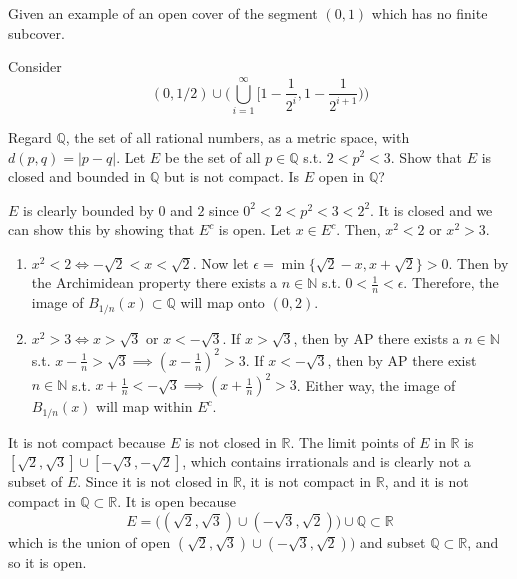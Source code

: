 \documentclass{article}
\begin{document}
    \begin{exercise}[Rudin 2.14]
    Given an example of an open cover of the segment $(0, 1)$ which has no finite subcover. 
    \end{exercise}
    \begin{solution}
    Consider 
    \[(0, 1/2) \cup \bigg( \bigcup_{i=1}^\infty \Big[ 1 - \frac{1}{2^i}, 1 - 
    \frac{1}{2^{i+1}} \Big) \bigg) \]
    \end{solution}

    \begin{exercise}[Rudin 2.15]

    \end{exercise}

    \begin{exercise}[Rudin 2.16]
    Regard $\mathbb{Q}$, the set of all rational numbers, as a metric space, with $d(p, q) = |p - q|$. Let $E$ be the set of all $p \in \mathbb{Q}$ s.t. $2 < p^2 < 3$. Show that $E$ is closed and bounded in $\mathbb{Q}$ but is not compact. Is $E$ open in $\mathbb{Q}$? 
    \end{exercise}
    \begin{solution}
    $E$ is clearly bounded by $0$ and $2$ since $0^2 < 2 < p^2 < 3 < 2^2$. It is closed and we can show this by showing that $E^c$ is open. Let $x \in E^c$. Then, $x^2< 2$ or $x^2 > 3$. 
    \begin{enumerate}
        \item $x^2 < 2 \iff -\sqrt{2} < x < \sqrt{2}$. Now let $\epsilon = \min\{ \sqrt{2} - x, x + \sqrt{2}\} > 0$. Then by the Archimidean property there exists a $n \in \mathbb{N}$ s.t. $0 < \frac{1}{n} < \epsilon$. Therefore, the image of $B_{1/n} (x) \subset \mathbb{Q}$ will map onto $(0, 2)$. 

        \item $x^2 > 3 \iff x > \sqrt{3}$ or $x < - \sqrt{3}$. If $x > \sqrt{3}$, then by AP there exists a $n \in \mathbb{N}$ s.t. $x - \frac{1}{n} > \sqrt{3} \implies (x - \frac{1}{n})^2 > 3$. If $x < - \sqrt{3}$, then by AP there exist $n \in \mathbb{N}$ s.t. $x + \frac{1}{n} < -\sqrt{3} \implies (x + \frac{1}{n})^2 > 3$. Either way, the image of $B_{1/n} (x)$ will map within $E^c$. 
    \end{enumerate}
    It is not compact because $E$ is not closed in $\mathbb{R}$. The limit points of $E$ in $\mathbb{R}$ is $[\sqrt{2}, \sqrt{3}] \cup [-\sqrt{3}, -\sqrt{2}]$, which contains irrationals and is clearly not a subset of $E$. Since it is not closed in $\mathbb{R}$, it is not compact in $\mathbb{R}$, and it is not compact in $\mathbb{Q} \subset \mathbb{R}$. It is open because 
    \[E = \big( (\sqrt{2}, \sqrt{3}) \cup (-\sqrt{3}, \sqrt{2})\big) \cup \mathbb{Q} \subset \mathbb{R}\]
    which is the union of open $(\sqrt{2}, \sqrt{3}) \cup (-\sqrt{3}, \sqrt{2})\big)$ and subset $\mathbb{Q} \subset \mathbb{R}$, and so it is open. 
    \end{solution}
\end{document}
